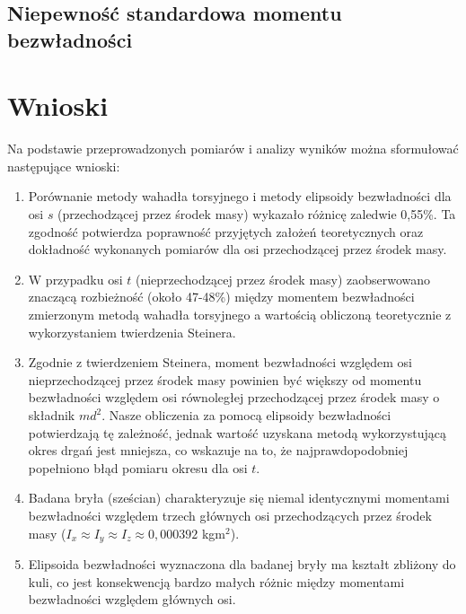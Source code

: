 \documentclass[a4paper,12pt]{article}
\begin{document}
\subsection*{Niepewność standardowa momentu bezwładności}






\section{Wnioski}


Na podstawie przeprowadzonych pomiarów i analizy wyników można sformułować następujące wnioski:

\begin{enumerate}
    \item Porównanie metody wahadła torsyjnego i metody elipsoidy bezwładności dla osi $s$ (przechodzącej przez środek masy) wykazało różnicę zaledwie 0,55\%. Ta zgodność potwierdza poprawność przyjętych założeń teoretycznych oraz dokładność wykonanych pomiarów dla osi przechodzącej przez środek masy.

    \item W przypadku osi $t$ (nieprzechodzącej przez środek masy) zaobserwowano znaczącą rozbieżność (około 47-48\%) między momentem bezwładności zmierzonym metodą wahadła torsyjnego a wartością obliczoną teoretycznie z wykorzystaniem twierdzenia Steinera.

    \item Zgodnie z twierdzeniem Steinera, moment bezwładności względem osi nieprzechodzącej przez środek masy powinien być większy od momentu bezwładności względem osi równoległej przechodzącej przez środek masy o składnik $md^2$. Nasze obliczenia za pomocą elipsoidy bezwładności potwierdzają tę zależność, jednak wartość uzyskana metodą wykorzystującą okres drgań jest mniejsza, co wskazuje na to, że najprawdopodobniej popełniono błąd pomiaru okresu dla osi $t$.

    \item Badana bryła (sześcian) charakteryzuje się niemal identycznymi momentami bezwładności względem trzech głównych osi przechodzących przez środek masy ($I_x \approx I_y \approx I_z \approx 0,000392$ kgm$^2$).

    \item Elipsoida bezwładności wyznaczona dla badanej bryły ma kształt zbliżony do kuli, co jest konsekwencją bardzo małych różnic między momentami bezwładności względem głównych osi.

\end{enumerate}




\end{document}
